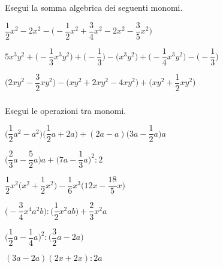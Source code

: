 \begin{esercizio}
 \label{ese:9.32}
Esegui la somma algebrica dei seguenti monomi.

\begin{enumeratea}
\spazielenx
 \item 
\(\dfrac{1}{2}x^{2}-2x^{2}-\bigg(-{\dfrac{1}{2}}x^{2}+\dfrac{3}{4}x^{2}-2x^{2}
-\dfrac{3}{5}x^{2}\bigg)\)
 \item 
\(5x^{3}y^{2}+\bigg(-{\dfrac{1}{3}}x^{3}y^{2}\bigg)+\bigg(-{\dfrac{1}{3}}
\bigg)-\big(x^{3}y^{2}\big)+\bigg(-{\dfrac{1}{4}}x^{3}y^{2}\bigg)-\bigg(-{\dfrac
{1}{3}}\bigg)\)
 \item 
\(\bigg(2xy^{2}-\dfrac{3}{2}xy^{2}\bigg)-\big(xy^{2}+2xy^{2}-4xy^{2}
\big)+\bigg(xy^{2}+\dfrac{1}{2}xy^{2}\bigg)\)
\end{enumeratea}
\end{esercizio}

\subsubsection*{}

\begin{esercizio}[\Ast]
 \label{ese:9.33}
Esegui le operazioni tra monomi.

\begin{enumeratea}
 \item 
\(\bigg(\dfrac{1}{2}a^{2}-a^{2}\bigg)\bigg(\dfrac{1}{2}
a+2a\bigg)+(2a-a)\bigg(3a-\dfrac{1}{2}a\bigg)a\)
 \item 
\(\bigg(\dfrac{2}{3}a-\dfrac{5}{2}a\bigg)a+\bigg(7a-\dfrac{1}{3}a\bigg)^{2}:2\)
 \item 
\(\dfrac{1}{2}x^{2}\bigg(x^{2}+\dfrac{1}{2}x^{2}\bigg)-\dfrac{1}{6}x^{3}
\bigg(12x-\dfrac{18}{5}x\bigg)\)
 \item 
\(\bigg(-{\dfrac{3}{4}}x^{4}a^{2}b\bigg):\bigg(\dfrac{1}{2}x^{2}ab\bigg)+\dfrac{2
}{3}x^{2}a\)
 \item 
\(\bigg(\dfrac{1}{2}a-\dfrac{1}{4}a\bigg)^{2}:\bigg(\dfrac{3}{2}a-2a\bigg)\)
 \item \((3a-2a)(2x+2x):2a\)
\end{enumeratea}
\end{esercizio}

